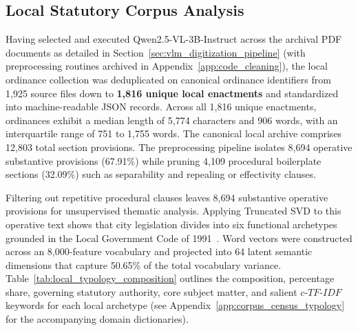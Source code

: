 \subsection{Local Statutory Corpus Analysis}
\label{sec:results_local_corpus_analysis}
Having selected and executed Qwen2.5-VL-3B-Instruct across the archival PDF documents as detailed in Section~\ref{sec:vlm_digitization_pipeline} (with preprocessing routines archived in Appendix~\ref{app:code_cleaning}), the local ordinance collection was deduplicated on canonical ordinance identifiers from 1,925 source files down to \textbf{1,816 unique local enactments} and standardized into machine-readable JSON records. Across all 1,816 unique enactments, ordinances exhibit a median length of 5,774 characters and 906 words, with an interquartile range of 751 to 1,755 words. The canonical local archive comprises 12,803 total section provisions. The preprocessing pipeline isolates 8,694 operative substantive provisions (67.91\%) while pruning 4,109 procedural boilerplate sections (32.09\%) such as separability and repealing or effectivity clauses.

Filtering out repetitive procedural clauses leaves 8,694 substantive operative provisions for unsupervised thematic analysis. Applying Truncated SVD to this operative text shows that city legislation divides into six functional archetypes grounded in the Local Government Code of 1991~\cite{philgov1991ra7160}. Word vectors were constructed across an 8,000-feature vocabulary and projected into 64 latent semantic dimensions that capture 50.65\% of the total vocabulary variance. Table~\ref{tab:local_typology_composition} outlines the composition, percentage share, governing statutory authority, core subject matter, and salient $c\text{-}TF\text{-}IDF$ keywords for each local archetype (see Appendix~\ref{app:corpus_census_typology} for the accompanying domain dictionaries).

